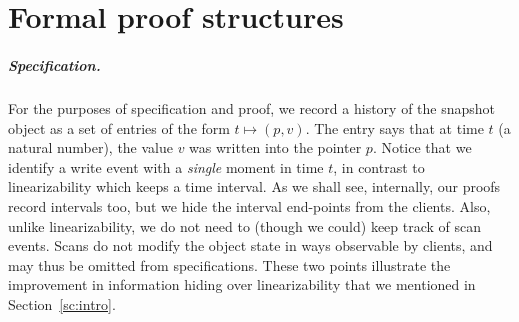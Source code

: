 \section{Formal proof structures}
\label{sc:formal}

\def\histx{\hist_\x}
\def\histy{\hist_\y}
\def\histp{\hist_p}
\def\ordlist{L}
\renewcommand{\tleq}{\mathrel{\leq_\ordlist}}
\renewcommand{\tle}{\mathrel{<_\ordlist}}
\renewcommand{\jleq}{\mathrel{\sqsubseteq_\ordlist}}
\newcommand{\E}{E}
\newcommand{\C}{C}
\newcommand{\sx}{S_\x}
\newcommand{\sy}{S_\y}
\newcommand{\spp}{S_p}
\newcommand{\sss}{S_s}
\newcommand{\wx}{W_\x}
\newcommand{\wy}{W_\y}
\newcommand{\wpp}{W_p}
\newcommand{\admissible}{\mathsf{fine}}

\def\toff{t_{\mathsf{off}}}
\newcommand{\wInit}{\mathsf{W_{off}}}
\newcommand{\wWrite}{\mathsf{New}}
\newcommand{\wDirty}{\mathsf{NeedsFwd}}
\newcommand{\wClean}{\mathsf{Done}}
\newcommand{\sOn}{\mathsf{S_{on}}}
\newcommand{\sOff}{\mathsf{S_{off}}}


\subparagraph*{Specification.}
%
For the purposes of specification and proof, we record a history of
the snapshot object as a set of entries of the form $t \mapsto (p,
v)$. The entry says that at time $t$ (a natural number), the value $v$
was written into the pointer $p$. Notice that we identify a write
event with a \emph{single} moment in time $t$, in contrast to
linearizability which keeps a time interval. As we shall see,
internally, our proofs record intervals too, but we hide the interval
end-points from the clients. Also, unlike linearizability, we do not
need to (though we could) keep track of scan events. Scans do not
modify the object state in ways observable by clients, and may thus be
omitted from specifications. These two points illustrate the
improvement in information hiding over linearizability that we
mentioned in Section~\ref{sc:intro}.


